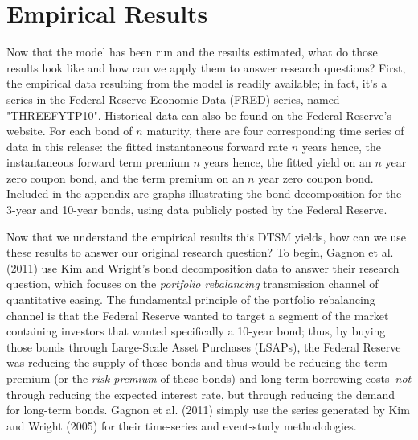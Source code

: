\documentclass[12pt,final]{article}
\begin{document}
\section{Empirical Results}
Now that the model has been run and the results estimated, what do those results look like and how can we apply them to answer research questions? First, the empirical data resulting from the model is readily available; in fact, it's a series in the Federal Reserve Economic Data (FRED) series, named "THREEFYTP10". \citep{fred_10} Historical data can also be found on the Federal Reserve's website. For each bond of $n$ maturity, there are four corresponding time series of data in this release: the fitted instantaneous forward rate $n$ years hence, the instantaneous forward term premium $n$ years hence, the fitted yield on an $n$ year zero coupon bond, and the term premium on an $n$ year zero coupon bond. Included in the appendix are graphs illustrating the bond decomposition for the 3-year and 10-year bonds, using data publicly posted by the Federal Reserve. 

Now that we understand the empirical results this DTSM yields, how can we use these results to answer our original research question? To begin, Gagnon et al. (2011) use Kim and Wright's bond decomposition data to answer their research question, which focuses on the \textit{portfolio rebalancing} transmission channel of quantitative easing. The fundamental principle of the portfolio rebalancing channel is that the Federal Reserve wanted to target a segment of the market containing investors that wanted specifically a 10-year bond; thus, by buying those bonds through Large-Scale Asset Purchases (LSAPs), the Federal Reserve was reducing the supply of those bonds and thus would be reducing the term premium (or the \textit{risk premium} of these bonds) and long-term borrowing costs--\textit{not} through reducing the expected interest rate, but through reducing the demand for long-term bonds. \citep{Gagnon2011} Gagnon et al. (2011) simply use the series generated by Kim and Wright (2005) for their time-series and event-study methodologies.
\end{document}
